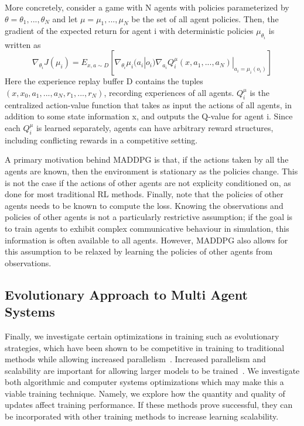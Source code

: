 More concretely, consider a game with N agents with policies parameterized by 
$\theta = {\theta_1, ..., \theta_N}$ and let $\mu = {\mu_1, ..., \mu_N}$ be the set of 
all agent policies. Then, the gradient of the expected return for agent i with deterministic 
policies $\mu_{\theta_i}$ is written as
\begin{equation}
\nabla_{\theta_i}J(\mu_i) = E_{x, a \sim D}[\nabla_{\theta_i}\mu_i(a_i|o_i)\nabla_{a_i}Q_i^{\mu}(x, a_1, ..., a_N)|_{a_i = \mu_i(o_i)}]
\end{equation}
Here the experience replay buffer D contains the tuples $(x, x_0, a_1,..., a_N, r_1,..., r_N)$, 
recording experiences of all agents. $Q^{\mu}_i$ is the centralized action-value function 
that takes as input the actions of all agents, in addition to some state information x, and outputs
the Q-value for agent i. Since each $Q^{\mu}_i$ is learned separately, agents can have 
arbitrary reward structures, including conflicting rewards in a competitive setting.  

A primary motivation behind MADDPG is that, if the actions taken by all the agents are known, 
then the environment is stationary as the policies change. This is not the case if the actions 
of other agents are not explicity conditioned on, as done for most traditional RL methods. 
Finally, note that the policies of other agents needs to be known to compute the loss. Knowing the 
observations and policies of other agents is not a particularly restrictive assumption; 
if the goal is to train agents to exhibit complex communicative behaviour in simulation, 
this information is often available to all agents. However, MADDPG also allows for
this assumption to be relaxed by learning the policies of other agents from observations.

\subsection{Evolutionary Approach to Multi Agent Systems}
Finally, we investigate certain optimizations in training such as
evolutionary strategies, which have been shown to be competitive in training
to traditional methods while allowing increased
parallelism~\cite{salimans2017evolution}.
Increased parallelism and scalability are important for allowing larger models to be trained~\cite{nair2015massively}.
We investigate both algorithmic and computer systems optimizations which may make this a viable training technique.
Namely, we explore how the quantity and quality of updates affect training performance.
If these methods prove successful, they can be incorporated with other training methods to increase learning scalability.

